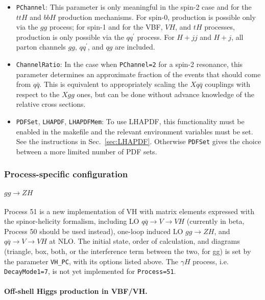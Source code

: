 \documentclass[aps,superscriptaddress,nofootinbib]{revtex4}
\begin{document}
\begin{itemize}
\item \verb|PChannel|: This parameter is only meaningful in the spin-2 case and for the $ttH$ and $bbH$ production mechanisms.  For spin-0, production is possible only via the $gg$ process; for spin-1 and for the VBF, $VH$, and $tH$ processes, production is only possible via the $qq^\prime$ process.  For $H+jj$ and $H+j$, all parton channels $gg$, $qq^\prime$, and $qg$ are included.
\item \verb|ChannelRatio|: In the case when \verb|PChannel=2| for a spin-2 resonance, this parameter determines an approximate fraction of the events that should come from $q\bar{q}$.  This is equivalent to appropriately scaling the $Xq\bar{q}$ couplings with respect to the $Xgg$ ones, but can be done without advance knowledge of the relative cross sections.
\item \verb|PDFSet|, \verb|LHAPDF|, \verb|LHAPDFMem|: To use LHAPDF, this functionality must be enabled in the makefile and the relevant environment variables must be set.  See the instructions in Sec.~\ref{sec:LHAPDF}.  Otherwise \verb|PDFSet| gives the choice between a more limited number of PDF sets.
\end{itemize}

\subsubsection{Process-specific configuration}

\paragraph{\texorpdfstring{$gg\to ZH$}{gg to ZH}}

Process 51 is a new implementation of VH with matrix elements expressed with the spinor-helicity formalism, 
including LO $q \bar q \to V \to VH$ (currently in beta, Process 50 should be used instead), 
one-loop induced LO $gg \to ZH$, and $q \bar q \to V \to VH$ at NLO. 
The initial state, order of calculation, and diagrams (triangle, box, both, or the interference term between the two, for gg) 
is set by the parameter \texttt{VH\_PC}, with its options listed above. 
The $\gamma H$ process, i.e. \texttt{DecayMode1=7}, is not yet implemented for \texttt{Process=51}.

\paragraph{Off-shell Higgs production in VBF/VH.}
\label{sec:offshell}
\end{document}
